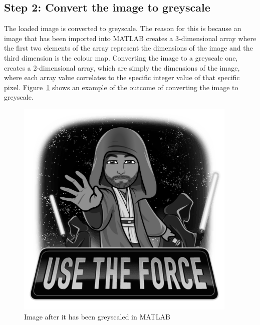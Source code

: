 \documentclass[10pt,twocolumn, a4paper]{witseiepaper}
\begin{document}
\subsection{Step 2: Convert the image to greyscale}
\label{sec: Step 2}
The loaded image is converted to greyscale. The reason for this is because an image that has been imported into MATLAB creates a 3-dimensional array where the first two elements of the array represent the dimensions of the image and the third dimension is the colour map. Converting the image to a greyscale one, creates a 2-dimensional array, which are simply the dimensions of the image, where each array value correlates to the specific integer value of that specific pixel. Figure~\ref{fig: Step 2} shows an example of the outcome of converting the image to greyscale.
\begin{figure}[h!]
\renewcommand{\thefigure}{\arabic{figure}}
\centering
\includegraphics[scale=0.5, frame]{Step2.png}
\caption{Image after it has been greyscaled in MATLAB}
\label{fig: Step 2}
\end{figure}
\end{document}
